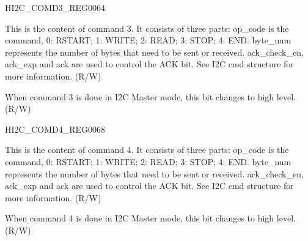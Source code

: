 \begin{register}{H}{I2C\_COMD3\_REG}{\hexprefix{}0064}\label{regdesc:I2CCOMD3REG}
%
%
%
\regnewline%
\begin{regdesc}\begin{reglist}
\label{fielddesc:I2CCOMMAND3}\item [I2C\_COMMAND3] This is the content of command 3. It consists of three parts:
op\_code is the command, 0: RSTART; 1: WRITE; 2: READ; 3: STOP; 4: END.
byte\_num represents the number of bytes that need to be sent or received.
ack\_check\_en, ack\_exp and ack are used to control the ACK bit. See I2C cmd structure for more information. (R/W)
\label{fielddesc:I2CCOMMAND3DONE}\item [I2C\_COMMAND3\_DONE] When command 3 is done in I2C Master mode, this bit changes to high level. (R/W)
\end{reglist}\end{regdesc}
\end{register}


\begin{register}{H}{I2C\_COMD4\_REG}{\hexprefix{}0068}\label{regdesc:I2CCOMD4REG}
%
%
%
\regnewline%
\begin{regdesc}\begin{reglist}
\label{fielddesc:I2CCOMMAND4}\item [I2C\_COMMAND4] This is the content of command 4. It consists of three parts:
op\_code is the command, 0: RSTART; 1: WRITE; 2: READ; 3: STOP; 4: END.
byte\_num represents the number of bytes that need to be sent or received.
ack\_check\_en, ack\_exp and ack are used to control the ACK bit. See I2C cmd structure for more information. (R/W)
\label{fielddesc:I2CCOMMAND4DONE}\item [I2C\_COMMAND4\_DONE] When command 4 is done in I2C Master mode, this bit changes to high level. (R/W)
\end{reglist}\end{regdesc}
\end{register}


